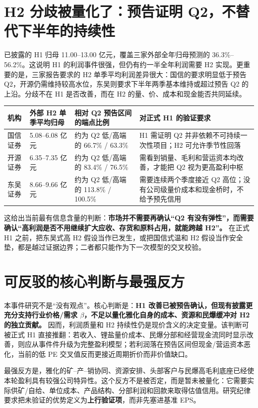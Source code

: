 \section{H2 分歧被量化了：预告证明 Q2，不替代下半年的持续性}

已披露的 H1 归母 11.00--13.00 亿元，覆盖三家外部全年归母预测的 36.3\%--56.2\%。这说明 H1 的利润事件很强，但仍有约一半全年利润需要 H2 实现。更重要的是，三家报告要求的 H2 单季平均利润差异很大：国信的要求明显低于预告 Q2，开源仍需维持较高水位，东吴则要求下半年两季基本维持或超过预告 Q2 的上沿。分歧不在 H1 是否改善，而在 H2 的量、价、成本和现金能否共同延续。

\begin{exhibitbox}
\begin{tabularx}{\exhibitboxwidth}{L{2.4cm}R{2.7cm}R{2.7cm}X}
\toprule
机构 & 外部 H2 单季平均归母 & 相对 Q2 预告区间的端点比例 & 对正式 H1 的验证要求 \\
\midrule
国信证券 & 5.08--6.08 亿元 & 约为 Q2 低/高端的 66.7\% / 63.3\% & H1 需证明 Q2 并非依赖不可持续一次性项目；H2 可允许季节性回落 \\
开源证券 & 6.35--7.35 亿元 & 约为 Q2 低/高端的 83.4\% / 76.5\% & 需看到销量、毛利和营运资本均改善，才能把 Q2 视为更高盈利中枢 \\
东吴证券 & 8.66--9.66 亿元 & 约为 Q2 低/高端的 113.8\% / 100.5\% & 需要连续两个季度接近 Q2 高位；没有公司级量价成本和现金桥时，不给予预先信用 \\
\bottomrule
\end{tabularx}
\end{exhibitbox}

这给出当前最有信息含量的判断：\textbf{市场并不需要再确认“Q2 有没有弹性”，而需要确认“高利润是否不用继续扩大应收、存货和原料占用，就能跨越 H2”。} 在正式 H1 之前，把东吴式高 H2 假设当作已发生，或把国信式温和 H2 假设当作安全垫，都是越过证据边界；二者都只能作为下一次模型的交叉校验。

\section{可反驳的核心判断与最强反方}

本事件研究不是“没有观点”。核心判断是：\textbf{H1 改善已被预告确认，但现有披露更充分支持行业价格/需求 $\beta$，不足以量化雅化自身的成本、资源和民爆缓冲对 H2 的独立贡献。} 因而，利润质量和 H2 持续性仍是现价含义的决定变量。该判断可被正式 H1 直接推翻：若收入、锂盐量价成本、民爆分部和经营现金流同时显示改善，则应从事件件升级为完整盈利模型；若利润落在预告区间但现金/营运资本恶化，当前的低 PE 交叉值反而更接近周期折价而非价值缺口。

最强反方是，雅化的矿--产--销协同、资源安排、头部客户与民爆高毛利底座已经使本轮盈利具有较强公司特异性。这个反方不是被否定，而是暂未被量化：它需要实际供矿/自给、单位成本、产品结构、分部利润和回款来取得估值信用。研究纪律要求把未验证的优势定义为\textbf{上行验证项}，而非先塞进基准 EPS。
